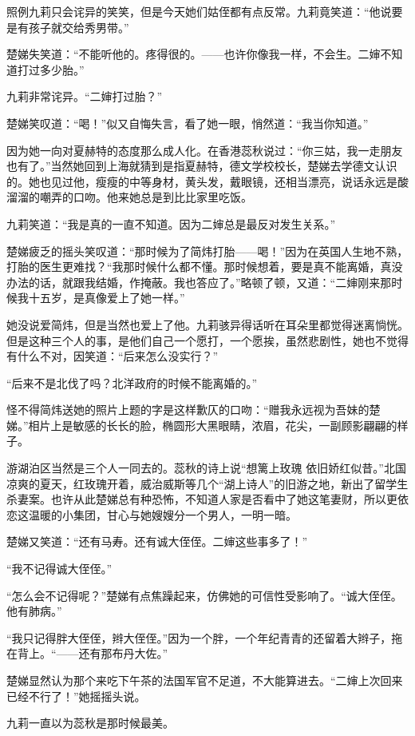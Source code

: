 \par 照例九莉只会诧异的笑笑，但是今天她们姑侄都有点反常。九莉竟笑道：“他说要是有孩子就交给秀男带。”
\par 楚娣失笑道：“不能听他的。疼得很的。——也许你像我一样，不会生。二婶不知道打过多少胎。”
\par 九莉非常诧异。“二婶打过胎？”
\par 楚娣笑叹道：“喝！”似又自悔失言，看了她一眼，悄然道：“我当你知道。”
\par 因为她一向对夏赫特的态度那么成人化。在香港蕊秋说过：“你三姑，我一走朋友也有了。”当然她回到上海就猜到是指夏赫特，德文学校校长，楚娣去学德文认识的。她也见过他，瘦瘦的中等身材，黄头发，戴眼镜，还相当漂亮，说话永远是酸溜溜的嘲弄的口吻。他来她总是到比比家里吃饭。
\par 九莉笑道：“我是真的一直不知道。因为二婶总是最反对发生关系。”
\par 楚娣疲乏的摇头笑叹道：“那时候为了简炜打胎——喝！”因为在英国人生地不熟，打胎的医生更难找？“我那时候什么都不懂。那时候想着，要是真不能离婚，真没办法的话，就跟我结婚，作掩蔽。我也答应了。”略顿了顿，又道：“二婶刚来那时候我十五岁，是真像爱上了她一样。”
\par 她没说爱简炜，但是当然也爱上了他。九莉骇异得话听在耳朵里都觉得迷离惝恍。但是这种三个人的事，是他们自己一个愿打，一个愿挨，虽然悲剧性，她也不觉得有什么不对，因笑道：“后来怎么没实行？”
\par “后来不是北伐了吗？北洋政府的时候不能离婚的。”
\par 怪不得简炜送她的照片上题的字是这样歉仄的口吻：“赠我永远视为吾妹的楚娣。”相片上是敏感的长长的脸，椭圆形大黑眼睛，浓眉，花尖，一副顾影翩翩的样子。
\par 游湖泊区当然是三个人一同去的。蕊秋的诗上说“想篱上玫瑰 依旧娇红似昔。”北国凉爽的夏天，红玫瑰开着，威治威斯等几个“湖上诗人”的旧游之地，新出了留学生杀妻案。也许从此楚娣总有种恐怖，不知道人家是否看中了她这笔妻财，所以更依恋这温暖的小集团，甘心与她嫂嫂分一个男人，一明一暗。
\par 楚娣又笑道：“还有马寿。还有诚大侄侄。二婶这些事多了！”
\par “我不记得诚大侄侄。”
\par “怎么会不记得呢？”楚娣有点焦躁起来，仿佛她的可信性受影响了。“诚大侄侄。他有肺病。”
\par “我只记得胖大侄侄，辫大侄侄。”因为一个胖，一个年纪青青的还留着大辫子，拖在背上。“——还有那布丹大佐。”
\par 楚娣显然认为那个来吃下午茶的法国军官不足道，不大能算进去。“二婶上次回来已经不行了！”她摇摇头说。
\par 九莉一直以为蕊秋是那时候最美。
